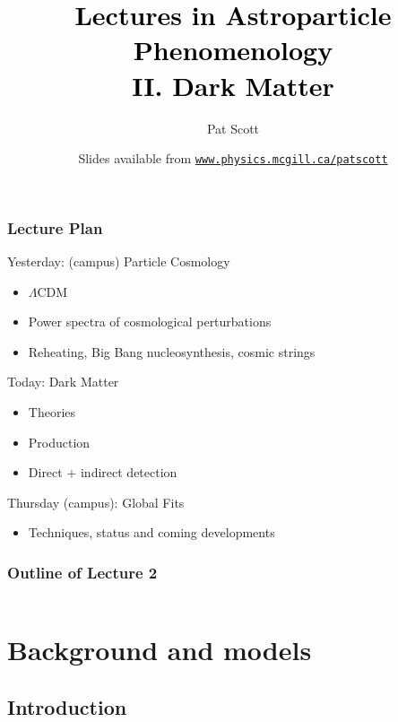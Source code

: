 \documentclass[xcolor=dvipsnames]{beamer}
\title[{\color[rgb]{0, 0, 0}Astroparticle Phenomenology II: Dark Matter}]{\textcolor{black}{Lectures in Astroparticle Phenomenology\\ II. Dark Matter}}
\author[Pat Scott -- Feb 26 -- University of Sydney]{Pat Scott}
\institute{\small{McGill University / Imperial College London}}
\date[Feb 26, 2014]{Slides available from \color[rgb]{0.1, 0.0, 0.6} \href{http://www.physics.mcgill.ca/~patscott}{\tt www.physics.mcgill.ca/{\urltilda}patscott}}
\newcommand{\cblue}[1]{{\color[rgb]{0.1, 0.0, 0.6} #1}}
\begin{document}
\maketitle


\begin{frame}
  \frametitle{Lecture Plan}

  \cblue{Yesterday}: (campus) Particle Cosmology
  \begin{itemize}
    \item $\Lambda$CDM
    \item Power spectra of cosmological perturbations
    \item Reheating, Big Bang nucleosynthesis, cosmic strings
  \end{itemize}
  \vspace{3mm}

  \cblue{Today}:  Dark Matter
  \begin{itemize}
    \item Theories
    \item Production
    \item Direct + indirect detection
  \end{itemize}
  \vspace{3mm}

  \cblue{Thursday} (campus):  Global Fits
  \begin{itemize}
    \item Techniques, status and coming developments
  \end{itemize}
    
\end{frame}


\begin{frame}
  \frametitle{Outline of Lecture 2}
  \begin{columns}[t]
	\tableofcontents[sections={1}]
        \vspace{3mm}
	\tableofcontents[sections={2}]
        \vspace{3mm}
	\tableofcontents[sections={3}]
  \end{columns}	
\end{frame}


\section{Background and models}

\subsection{Introduction}
\end{document}
